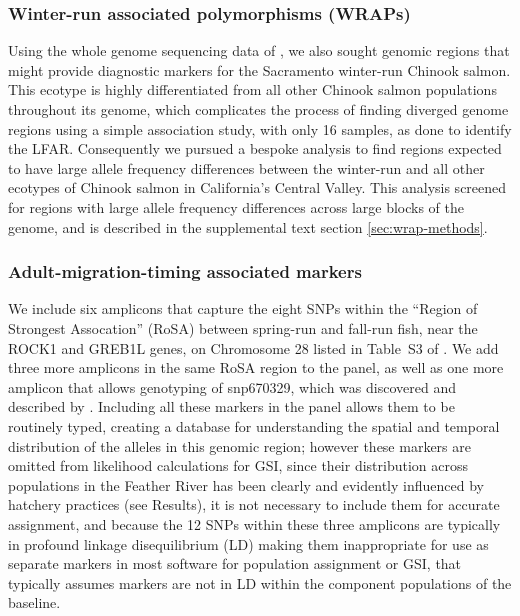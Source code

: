 \subsubsection*{Winter-run associated polymorphisms (WRAPs)}

Using the whole genome sequencing data of \citet{thompson2020complex}, we also sought
genomic regions that might provide diagnostic markers for the Sacramento winter-run
Chinook salmon.  This ecotype is highly differentiated from all other Chinook salmon populations
throughout its genome, which complicates the process of finding diverged genome regions using
a simple association study, with only 16 samples, as done to identify the LFAR.  Consequently we pursued a bespoke
analysis to find regions expected to have large allele frequency differences between
the winter-run and all other ecotypes of Chinook salmon in California's Central Valley.   This analysis
screened for regions with large allele frequency differences across large blocks of the genome, and is
described in the supplemental text section \ref{sec:wrap-methods}.

\subsubsection*{Adult-migration-timing associated markers}

We include six amplicons that capture the eight  SNPs within the ``Region of Strongest Assocation'' (RoSA)
between spring-run and fall-run fish, near the ROCK1 and GREB1L genes,  on Chromosome 28 listed in Table~S3 of \citet{thompson2020complex}.
We add three more amplicons in the same RoSA region to the panel, as well as one more amplicon that
allows genotyping of snp670329, which was discovered and described by \citet{thompson2019anthropogenic}.
Including all these markers in the panel allows them to be routinely typed, creating
 a database for understanding the spatial and temporal
distribution of the alleles in this genomic region; however these markers are omitted from likelihood calculations for
GSI, since their distribution across populations in the Feather River has been clearly and evidently
influenced by hatchery practices (see Results), it is not necessary to include them for accurate assignment,
and because the 12 SNPs within these three amplicons are typically in profound linkage disequilibrium (LD)
making them inappropriate for use as separate markers in most software for population assignment or GSI, that
typically assumes markers are not in LD within the component populations of the baseline.




